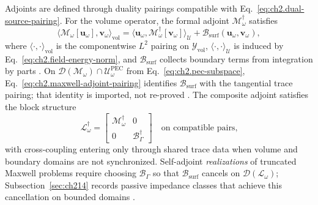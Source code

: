 Adjoints are defined through duality pairings compatible with Eq.~\eqref{eq:ch2.dual-source-pairing}. For the volume operator, the formal adjoint \(\mathcal{M}_\omega^{\dagger}\) satisfies
\begin{equation}
\label{eq:ch2.volume-adjoint-definition}
\langle\mathcal{M}_\omega[\mathbf{u}_\omega],\mathbf{v}_\omega\rangle_{\mathrm{vol}}
=
\langle\mathbf{u}_\omega,\mathcal{M}_\omega^{\dagger}[\mathbf{v}_\omega]\rangle_{\mathcal{U}}
+\mathcal{B}_{\mathrm{surf}}(\mathbf{u}_\omega,\mathbf{v}_\omega),
\end{equation}
where \(\langle\cdot,\cdot\rangle_{\mathrm{vol}}\) is the componentwise \(L^{2}\) pairing on \(\mathcal{Y}_{\mathrm{vol}}\), \(\langle\cdot,\cdot\rangle_{\mathcal{U}}\) is induced by Eq.~\eqref{eq:ch2.field-energy-norm}, and \(\mathcal{B}_{\mathrm{surf}}\) collects boundary terms from integration by parts \cite{stratton1941}. On \(\mathcal{D}(\mathcal{M}_\omega)\cap\mathcal{U}_\omega^{\mathrm{PEC}}\) from Eq.~\eqref{eq:ch2.pec-subspace}, Eq.~\eqref{eq:ch2.maxwell-adjoint-pairing} identifies \(\mathcal{B}_{\mathrm{surf}}\) with the tangential trace pairing; that identity is imported, not re-proved \cite{stratton1941}. The composite adjoint satisfies the block structure
\begin{equation}
\label{eq:ch2.composite-adjoint-block}
\mathcal{L}_\omega^{\dagger}
=
\begin{bmatrix}
\mathcal{M}_\omega^{\dagger} & 0\\
0 & \mathcal{B}_\Gamma^{\dagger}
\end{bmatrix}
\quad\text{on compatible pairs,}
\end{equation}
with cross-coupling entering only through shared trace data when volume and boundary domains are not synchronized. Self-adjoint \emph{realizations} of truncated Maxwell problems require choosing \(\mathcal{B}_\Gamma\) so that \(\mathcal{B}_{\mathrm{surf}}\) cancels on \(\mathcal{D}(\mathcal{L}_\omega)\); Subsection~\ref{sec:ch214} records passive impedance classes that achieve this cancellation on bounded domains \cite{stratton1941}.

